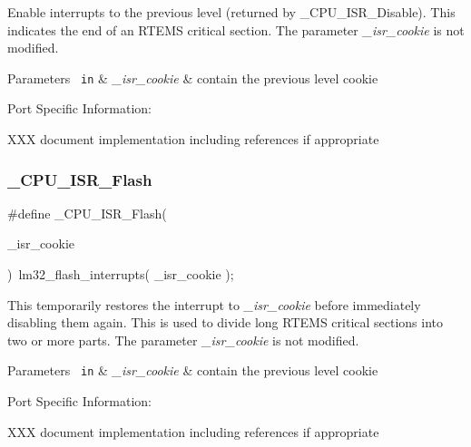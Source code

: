Enable interrupts to the previous level (returned by \+\_\+\+C\+P\+U\+\_\+\+I\+S\+R\+\_\+\+Disable). This indicates the end of an R\+T\+E\+MS critical section. The parameter {\itshape \+\_\+isr\+\_\+cookie} is not modified.


\begin{DoxyParams}[1]{Parameters}
\mbox{\texttt{ in}}  & {\em \+\_\+isr\+\_\+cookie} & contain the previous level cookie\\
\hline
\end{DoxyParams}
Port Specific Information\+:

X\+XX document implementation including references if appropriate \mbox{\label{group__RTEMSScoreCPUlm32Interrupt_gac7e58e16c6b558daf31fe8f9dbec5a69}} 
\subsubsection{\texorpdfstring{\_CPU\_ISR\_Flash}{\_CPU\_ISR\_Flash}}
{\footnotesize\ttfamily \#define \+\_\+\+C\+P\+U\+\_\+\+I\+S\+R\+\_\+\+Flash(\begin{DoxyParamCaption}\item[{}]{\+\_\+isr\+\_\+cookie }\end{DoxyParamCaption})~lm32\+\_\+flash\+\_\+interrupts( \+\_\+isr\+\_\+cookie );}

This temporarily restores the interrupt to {\itshape \+\_\+isr\+\_\+cookie} before immediately disabling them again. This is used to divide long R\+T\+E\+MS critical sections into two or more parts. The parameter {\itshape \+\_\+isr\+\_\+cookie} is not modified.


\begin{DoxyParams}[1]{Parameters}
\mbox{\texttt{ in}}  & {\em \+\_\+isr\+\_\+cookie} & contain the previous level cookie\\
\hline
\end{DoxyParams}
Port Specific Information\+:

X\+XX document implementation including references if appropriate \mbox{\label{group__RTEMSScoreCPUlm32Interrupt_gaed8717a2f15938d954c7124cd11e899f}} 
